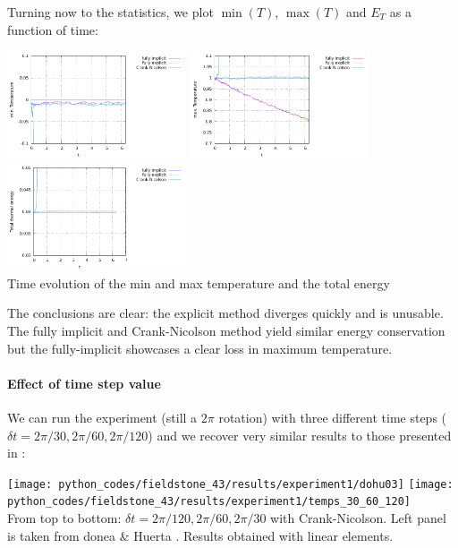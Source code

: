 Turning now to the statistics, we plot $\min(T)$, $\max(T)$ and $E_T$ as a function of time:
\begin{center}
\includegraphics[width=5.3cm]{python_codes/fieldstone_43/results/experiment1/Tmin.pdf}
\includegraphics[width=5.3cm]{python_codes/fieldstone_43/results/experiment1/Tmax.pdf}
\includegraphics[width=5.3cm]{python_codes/fieldstone_43/results/experiment1/ET.pdf}\\
{\captionfont Time evolution of the min and max temperature and the total energy}
\end{center}
The conclusions are clear: the explicit method diverges quickly and is unusable. 
The fully implicit and Crank-Nicolson 
method yield similar energy conservation but the fully-implicit showcases 
a clear loss in maximum temperature.

\paragraph{Effect of time step value} 
We can run the experiment (still a $2\pi$ rotation) 
with three different time steps ($\delta t=2\pi/30,2\pi/60,2\pi/120$) 
and we recover very similar results to those presented in \cite{dohu03}:
\begin{center}
\texttt{[image: python\_codes/fieldstone\_43/results/experiment1/dohu03]}
\texttt{[image: python\_codes/fieldstone\_43/results/experiment1/temps\_30\_60\_120]}\\
{\captionfont From top to bottom: $\delta t=2\pi/120,2\pi/60,2\pi/30$ with Crank-Nicolson. Left panel is taken from donea \& Huerta \cite{dohu03}. Results obtained with linear elements.}
\end{center}



